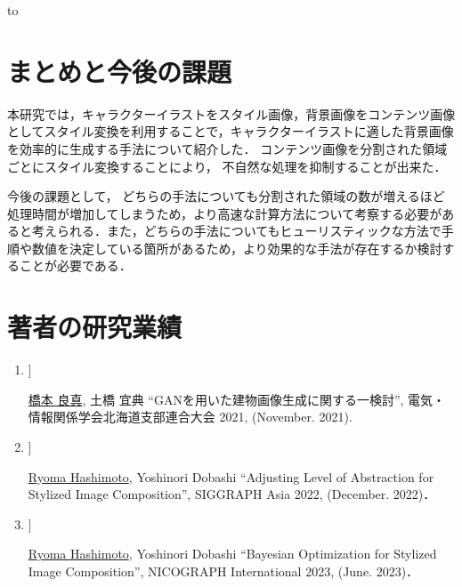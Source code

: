 \documentclass[twocolumn,a4j,dvipdfmx]{jsarticle_customized1}
\begin{document}
\begin{table}[hbt] 
\vspace*{0.5mm}
\hbox to
\caption{5つに領域分割された背景画像を用いた\\
ユーザスタディの結果} 
\label{tab:userstudy_2}
\end{table}

\section{まとめと今後の課題}\label{sec:summary}
本研究では，キャラクターイラストをスタイル画像，背景画像をコンテンツ画像としてスタイル変換を利用することで，キャラクターイラストに適した背景画像を効率的に生成する手法について紹介した．
コンテンツ画像を分割された領域ごとにスタイル変換することにより， 不自然な処理を抑制することが出来た．

今後の課題として， どちらの手法についても分割された領域の数が増えるほど処理時間が増加してしまうため，より高速な計算方法について考察する必要があると考えられる．また，どちらの手法についてもヒューリスティックな方法で手順や数値を決定している箇所があるため，より効果的な手法が存在するか検討することが必要である．

\printbibliography[title={参考文献}]

{\fontsize{7.5pt}{8.5pt}\selectfont\section*{\normalsize{\bf{著者の研究業績}}}
	\setcounter{number}{1}
	\newcommand{\num}{\arabic{number}}
	\begin{enumerate}
            \item[ [\num] \hspace{-0.8zw} ] \addtocounter{number}{1}
    	\underline{橋本 良真}, 土橋 宜典
    	``GANを用いた建物画像生成に関する一検討'',
    	電気・情報関係学会北海道支部連合大会 2021,
        (November. 2021).
    
            \item[ [\num] \hspace{-0.8zw} ] \addtocounter{number}{1}
    	\underline{Ryoma Hashimoto}, Yoshinori Dobashi
    	``Adjusting Level of Abstraction for Stylized Image Composition'',
    	SIGGRAPH Asia 2022,
        (December. 2022)．
    
            \item[ [\num] \hspace{-0.8zw} ] \addtocounter{number}{1}
    	\underline{Ryoma Hashimoto}, Yoshinori Dobashi
    	``Bayesian Optimization for Stylized Image Composition'',
    	NICOGRAPH International 2023,
        (June. 2023)．
    
	\end{enumerate}
}
\end{document}
